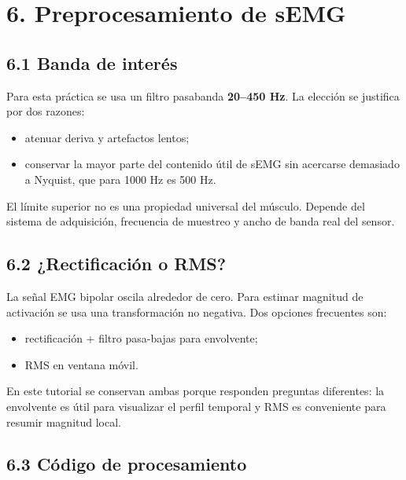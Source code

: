 \documentclass[
  spanish,
  a4paper,
  DIV=11,
  numbers=noendperiod]{scrreprt}
\providecommand{\tightlist}{%
  \setlength{\itemsep}{0pt}\setlength{\parskip}{0pt}}
\begin{document}
\chapter{6. Preprocesamiento de sEMG}\label{preprocesamiento-de-semg}

\section{6.1 Banda de interés}\label{banda-de-interuxe9s}

Para esta práctica se usa un filtro pasabanda \textbf{20--450 Hz}. La
elección se justifica por dos razones:

\begin{itemize}
\tightlist
\item
  atenuar deriva y artefactos lentos;
\item
  conservar la mayor parte del contenido útil de sEMG sin acercarse
  demasiado a Nyquist, que para 1000 Hz es 500 Hz.
\end{itemize}

El límite superior no es una propiedad universal del músculo. Depende
del sistema de adquisición, frecuencia de muestreo y ancho de banda real
del sensor.

\section{6.2 ¿Rectificación o RMS?}\label{rectificaciuxf3n-o-rms}

La señal EMG bipolar oscila alrededor de cero. Para estimar magnitud de
activación se usa una transformación no negativa. Dos opciones
frecuentes son:

\begin{itemize}
\tightlist
\item
  rectificación + filtro pasa-bajas para envolvente;
\item
  RMS en ventana móvil.
\end{itemize}

En este tutorial se conservan ambas porque responden preguntas
diferentes: la envolvente es útil para visualizar el perfil temporal y
RMS es conveniente para resumir magnitud local.

\section{6.3 Código de procesamiento}\label{cuxf3digo-de-procesamiento}
\end{document}
